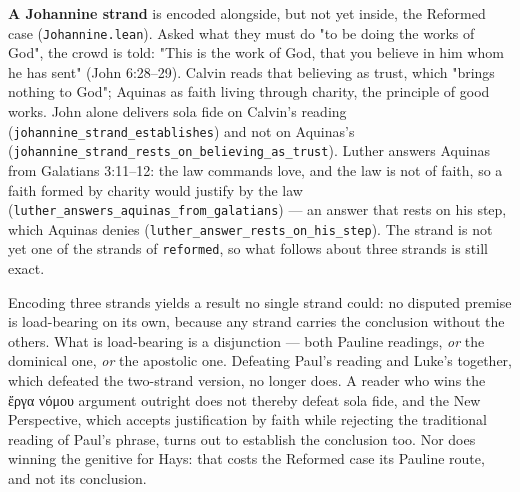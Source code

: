 \documentclass[11pt]{article}
\begin{document}
\textbf{A Johannine strand} is encoded alongside, but not yet inside, the Reformed case (\texttt{Johannine.lean}). Asked what they must do "to be doing the works of God", the crowd is told: "This is the work of God, that you believe in him whom he has sent" (John 6:28–29). Calvin reads that believing as trust, which "brings nothing to God"; Aquinas as faith living through charity, the principle of good works. John alone delivers sola fide on Calvin's reading (\texttt{johannine\_\allowbreak{}strand\_\allowbreak{}establishes}) and not on Aquinas's (\texttt{johannine\_\allowbreak{}strand\_\allowbreak{}rests\_\allowbreak{}on\_\allowbreak{}believing\_\allowbreak{}as\_\allowbreak{}trust}). Luther answers Aquinas from Galatians 3:11–12: the law commands love, and the law is not of faith, so a faith formed by charity would justify by the law (\texttt{luther\_\allowbreak{}answers\_\allowbreak{}aquinas\_\allowbreak{}from\_\allowbreak{}galatians}) — an answer that rests on his step, which Aquinas denies (\texttt{luther\_\allowbreak{}answer\_\allowbreak{}rests\_\allowbreak{}on\_\allowbreak{}his\_\allowbreak{}step}). The strand is not yet one of the strands of \texttt{reformed}, so what follows about three strands is still exact.

Encoding three strands yields a result no single strand could: no disputed premise is load-bearing on its own, because any strand carries the conclusion without the others. What is load-bearing is a disjunction — both Pauline readings, \emph{or} the dominical one, \emph{or} the apostolic one. Defeating Paul's reading and Luke's together, which defeated the two-strand version, no longer does. A reader who wins the ἔργα νόμου argument outright does not thereby defeat sola fide, and the New Perspective, which accepts justification by faith while rejecting the traditional reading of Paul's phrase, turns out to establish the conclusion too. Nor does winning the genitive for Hays: that costs the Reformed case its Pauline route, and not its conclusion.
\end{document}
